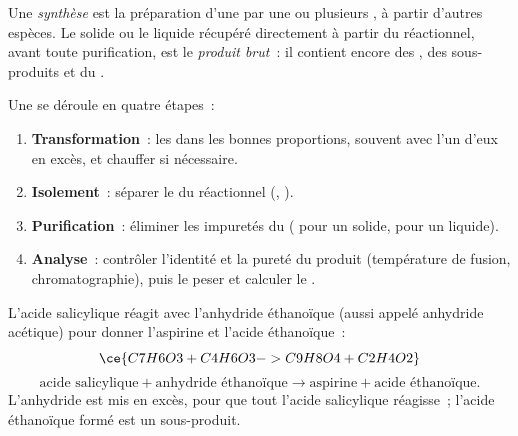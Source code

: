\begin{definition}\label{def:g10:synthesis-yield:synthesis}
Une \emph{synthèse} est la préparation d'une  par une ou plusieurs , à partir d'autres
espèces. Le solide ou le liquide récupéré directement à partir du
 réactionnel, avant toute purification, est le \emph{produit
brut}~: il contient encore des , des
sous-produits et du .
\end{definition}

\begin{method}\label{met:g10:synthesis-yield:plan}
Une  se déroule en quatre étapes~:
\begin{enumerate}
  \item \textbf{Transformation}~:  les  dans les bonnes
        proportions, souvent avec l'un d'eux en excès, et chauffer si
        nécessaire.
  \item \textbf{Isolement}~: séparer le  du 
        réactionnel (, ).
  \item \textbf{Purification}~: éliminer les impuretés du 
        ( pour un solide,  pour un
        liquide).
  \item \textbf{Analyse}~: contrôler l'identité et la pureté du produit
        (température de fusion, chromatographie), puis le peser et
        calculer le .
\end{enumerate}
\end{method}

\begin{example}\label{ex:g10:synthesis-yield:aspirin}
L'acide salicylique réagit avec l'anhydride éthanoïque (aussi appelé
anhydride acétique) pour donner l'aspirine et l'acide éthanoïque~:
\[
  \ce{C7H6O3 + C4H6O3 -> C9H8O4 + C2H4O2}
\]
\[
  \text{acide salicylique} + \text{anhydride éthanoïque} \longrightarrow
  \text{aspirine} + \text{acide éthanoïque}.
\]
L'anhydride est mis en excès, pour que tout l'acide salicylique
réagisse~; l'acide éthanoïque formé est un sous-produit.
\end{example}

